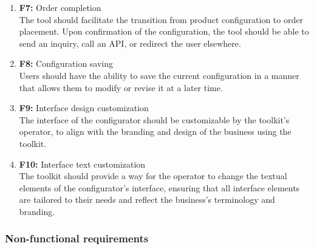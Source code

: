 \begin{enumerate}
\item \textbf{F7:} Order completion
\\The tool should facilitate the transition from product configuration to order placement. Upon confirmation of the configuration, the tool should be able to send an inquiry, call an API, or redirect the user elsewhere.

\item \textbf{F8:} Configuration saving
\\Users should have the ability to save the current configuration in a manner that allows them to modify or revise it at a later time.

\item \textbf{F9:} Interface design customization
\\The interface of the configurator should be customizable by the toolkit's operator, to align with the branding and design of the business using the toolkit.

\item \textbf{F10:} Interface text customization
\\The toolkit should provide a way for the operator to change the textual elements of the configurator's interface, ensuring that all interface elements are tailored to their needs and reflect the business's terminology and branding.


\end{enumerate}

\subsubsection{Non-functional requirements}

